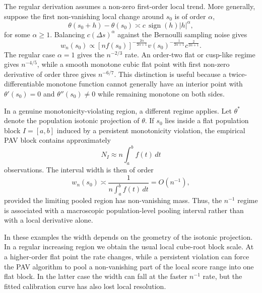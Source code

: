 \documentclass[11pt]{article}
\begin{document}
	The regular derivation assumes a non-zero first-order local trend. More generally, suppose the first non-vanishing local change around $s_0$ is of order $\alpha$,
	\begin{equation}
		\theta(s_0+h)-\theta(s_0)
		\asymp
		c\,\operatorname{sign}(h)|h|^{\alpha},
	\end{equation}
	for some $\alpha\ge1$. Balancing $c(\Delta s)^\alpha$ against the Bernoulli sampling noise gives
	\begin{equation}
		w_n(s_0)
		\propto
		[nf(s_0)]^{-\frac{2\alpha}{2\alpha+1}}
		v(s_0)^{-\frac{1}{2\alpha+1}}
		c^{\frac{2}{2\alpha+1}}.
		\label{eq:general_order_scaling}
	\end{equation}
	The regular case $\alpha=1$ gives the $n^{-2/3}$ rate. An order-two flat or cusp-like regime gives $n^{-4/5}$, while a smooth monotone cubic flat point with first non-zero derivative of order three gives $n^{-6/7}$. This distinction is useful because a twice-differentiable monotone function cannot generally have an interior point with $\theta'(s_0)=0$ and $\theta''(s_0)\ne0$ while remaining monotone on both sides.
	
	In a genuine monotonicity-violating region, a different regime applies. Let $\theta^*$ denote the population isotonic projection of $\theta$. If $s_0$ lies inside a flat population block $I=[a,b]$ induced by a persistent monotonicity violation, the empirical PAV block contains approximately
	\begin{equation}
		N_I \approx n\int_a^b f(t)\,dt
	\end{equation}
	observations. The interval width is then of order
	\begin{equation}
		w_n(s_0)
		\asymp
		\frac{1}{n\int_a^b f(t)\,dt}
		=
		O(n^{-1}),
		\label{eq:scaling_law_violation}
	\end{equation}
	provided the limiting pooled region has non-vanishing mass. Thus, the $n^{-1}$ regime is associated with a macroscopic population-level pooling interval rather than with a local derivative alone.
	
	In these examples the width depends on the geometry of the isotonic projection. In a regular increasing region we obtain the usual local cube-root block scale. At a higher-order flat point the rate changes, while a persistent violation can force the PAV algorithm to pool a non-vanishing part of the local score range into one flat block. In the latter case the width can fall at the faster $n^{-1}$ rate, but the fitted calibration curve has also lost local resolution.
	
\end{document}
